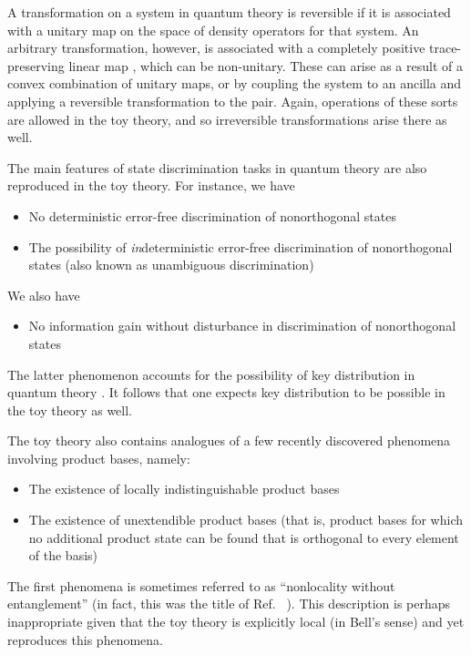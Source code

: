 \documentclass[pra,nofootinbib,showpacs,12pt]{revtex4}
\begin{document}
A transformation on a system in quantum theory is reversible if it is
associated with a unitary map on the space of density operators for that
system. An arbitrary transformation, however, is associated with a
completely positive trace-preserving linear map \cite{NielsenChuang}, which
can be non-unitary. These can arise as a result of a convex combination of
unitary maps, or by coupling the system to an ancilla and applying a
reversible transformation to the pair. Again, operations of these sorts are
allowed in the toy theory, and so irreversible transformations arise there
as well.

The main features of state discrimination tasks in quantum theory \cite%
{Cheflesreview} are also reproduced in the toy theory. For instance, we have

\begin{itemize}
\item No deterministic error-free discrimination of nonorthogonal states

\item The possibility of \emph{in}deterministic error-free discrimination of
nonorthogonal states (also known as unambiguous discrimination)
\end{itemize}

We also have

\begin{itemize}
\item No information gain without disturbance in discrimination of
nonorthogonal states
\end{itemize}

The latter phenomenon accounts for the possibility of key distribution in
quantum theory \cite{infogaintradeoff,BB84}. It follows that one expects key
distribution to be possible in the toy theory as well.

The toy theory also contains analogues of a few recently discovered
phenomena involving product bases, namely:

\begin{itemize}
\item The existence of locally indistinguishable product bases \cite%
{NLwoutentanglement}

\item The existence of unextendible product bases (that is, product bases
for which no additional product state can be found that is orthogonal to
every element of the basis) \cite{UPBs}
\end{itemize}

The first phenomena is sometimes referred to as ``nonlocality without
entanglement'' (in fact, this was the title of Ref.~\cite{NLwoutentanglement}%
). This description is perhaps inappropriate given that the toy theory is
explicitly local (in Bell's sense) and yet reproduces this phenomena.
\end{document}
